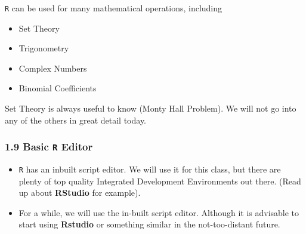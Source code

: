 \documentclass{beamer}
\begin{document}
 	\begin{frame}
 		
 		\texttt{R} can be used for many mathematical operations, including
 		
 		\begin{itemize}
 			\item Set Theory
 			\item Trigonometry
 			\item Complex Numbers
 			\item Binomial Coefficients
 		\end{itemize}
 		Set Theory is always useful to know (Monty Hall Problem). We will not go into any of the others in great detail today.
 	\end{frame}

 	\begin{frame}
 		\frametitle{1.9 Basic \texttt{R} Editor}
 		\begin{itemize}
 		\item \texttt{R} has an inbuilt script editor. We will use it for this class, but there are plenty of top quality
 		Integrated Development Environments out there. (Read up about \textbf{RStudio} for example).
 		\item For a while, we will use the in-built script editor. Although it is advisable to start using \textbf{Rstudio} or something similar in the not-too-distant future.
 		\end{itemize}
 		
 	\end{frame}
 	
\end{document}
